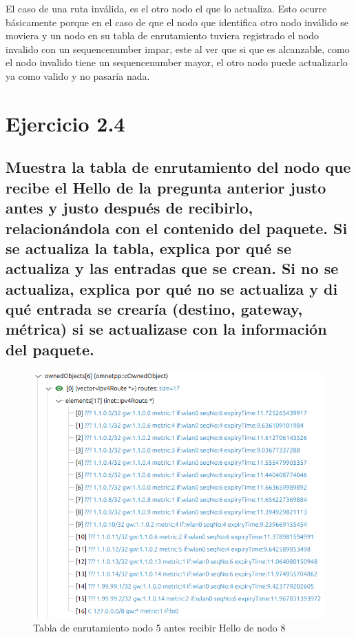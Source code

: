 El caso de una ruta inválida, es el otro nodo el que lo actualiza. Esto ocurre básicamente porque en el caso de que el nodo que identifica otro nodo inválido se moviera y un nodo en su tabla de enrutamiento tuviera registrado el nodo invalido con un sequencenumber impar, este al ver que si que es alcanzable, como el nodo invalido tiene un sequencenumber mayor, el otro nodo puede actualizarlo ya como valido y no pasaría nada.

\section{Ejercicio 2.4}

\subsection{Muestra la tabla de enrutamiento del nodo que recibe el Hello de la pregunta anterior justo antes y justo
después de recibirlo, relacionándola con el contenido del paquete. Si se actualiza la tabla, explica por qué se
actualiza y las entradas que se crean. Si no se actualiza, explica por qué no se actualiza y di qué entrada se
crearía (destino, gateway, métrica) si se actualizase con la información del paquete.}

\begin{figure}[H]
    \centering
    \includegraphics[width=115mm, scale=0.75]{imaxes/dsdv/ejercicio2_4_nodo5.png}
    \caption{Tabla de enrutamiento nodo 5 antes recibir Hello de nodo 8}
    \label{fig:ejer2_4_1}
\end{figure}

